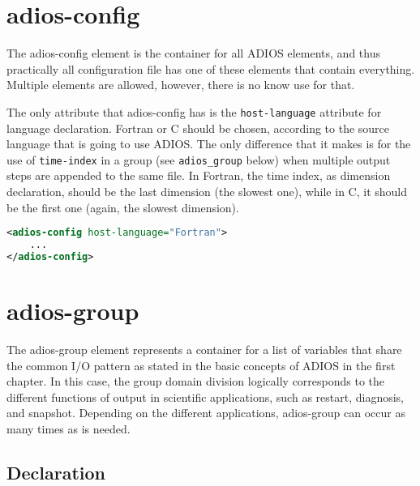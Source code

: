 \section{adios-config}
The adios-config element is the container for all ADIOS elements, and thus practically
all configuration file has one of these elements that contain everything. Multiple 
elements are allowed, however, there is no know use for that. 

The only attribute that adios-config has is the \verb+host-language+ attribute for 
language declaration. Fortran or C should be chosen, according to the source 
language that is going to use ADIOS. The only difference that it makes is for
the use of \verb+time-index+ in a group (see \verb+adios_group+ below) when multiple output 
steps are appended to the
same file. In Fortran, the time index, as dimension declaration, should be the last
dimension (the slowest one), while in C, it should be the first one (again, the slowest
dimension).

\begin{lstlisting}[language=XML]
<adios-config host-language="Fortran">
    ...
</adios-config>
\end{lstlisting}


\section{adios-group}
The adios-group element represents a container for a list of variables that share 
the common I/O pattern as stated in the basic concepts of ADIOS in the first chapter. 
In this case, the group domain division logically corresponds to the different 
functions of output in scientific applications, such as restart, diagnosis, and 
snapshot. Depending on the different applications, adios-group can occur as many 
times as is needed.

\subsection{Declaration}

